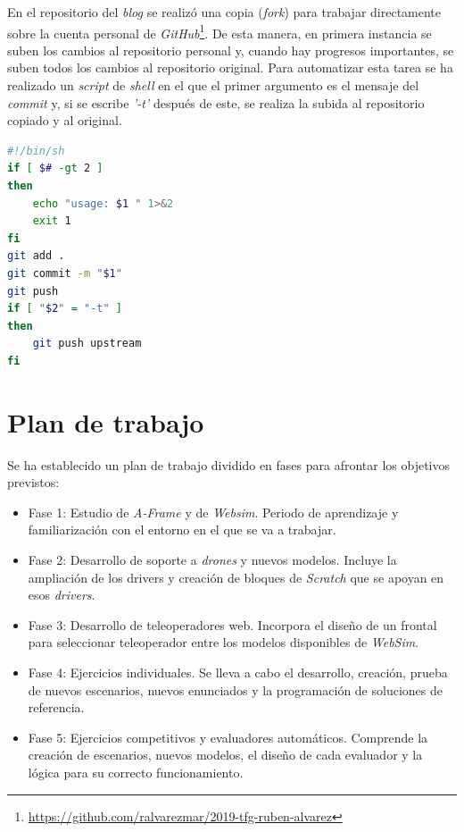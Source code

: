 En el repositorio del \textit{blog} se realizó una copia (\textit{fork}) para trabajar directamente sobre la cuenta personal de \textit{GitHub}\footnote{\url{https://github.com/ralvarezmar/2019-tfg-ruben-alvarez}}. De esta manera, en primera instancia se suben los cambios al repositorio personal y, cuando hay progresos importantes, se suben todos los cambios al repositorio original. Para automatizar esta tarea se ha realizado un \textit{script} de \textit{shell} en el que el primer argumento es el mensaje del \textit{commit} y, si se escribe \textit{'-t'} después de este, se realiza la subida al repositorio copiado y al original.\newline

\begin{lstlisting}[language=bash, caption=\textit{Script} para subir código a \textit{GitHub}]
#!/bin/sh
if [ $# -gt 2 ]
then
	echo "usage: $1 " 1>&2
	exit 1
fi
git add .
git commit -m "$1"
git push
if [ "$2" = "-t" ]
then
	git push upstream
fi
\end{lstlisting}

\section{Plan de trabajo}
\label{sec:plan}

Se ha establecido un plan de trabajo dividido en fases para afrontar los objetivos previstos: 
\begin{itemize}
    \item Fase 1: Estudio de \textit{A-Frame} y de \textit{Websim}. Periodo de aprendizaje y familiarización con el entorno en el que se va a trabajar. 
    \item Fase 2: Desarrollo de soporte a \textit{drones} y nuevos modelos. Incluye la ampliación de los drivers y creación de bloques de \textit{Scratch} que se apoyan en esos \textit{drivers}.
    \item Fase 3: Desarrollo de teleoperadores web. Incorpora el diseño de un frontal para seleccionar teleoperador entre los modelos disponibles de \textit{WebSim}.
    \item Fase 4: Ejercicios individuales. Se lleva a cabo el desarrollo, creación, prueba de nuevos escenarios, nuevos enunciados y la programación de soluciones de referencia. 
    \item Fase 5: Ejercicios competitivos y evaluadores automáticos. Comprende la creación de escenarios, nuevos modelos, el diseño de cada evaluador y la lógica para su correcto funcionamiento. 
\end{itemize}